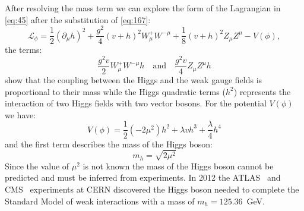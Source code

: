 After resolving the mass term we can explore the form of the Lagrangian in
\cref{eq:45} after the substitution of \cref{eq:167}:
\begin{equation}
  \label{eq:174}
  \mathcal{L}_\phi = \frac{1}{2} \left( \partial_\mu h \right)^2 +
  \frac{g^2}{4}(v + h)^2 W_\mu^+ {W^-}^\mu + \frac{1}{8}(v + h)^2 Z_\mu Z^\mu -
  V(\phi),
\end{equation}
the terms:
\begin{equation}
  \label{eq:175}
  \frac{g^2v}{2} W_\mu^+ {W^-}^\mu h \quad \mathrm{and} \quad \frac{g^2v}{4}
  Z_\mu Z^\mu h
\end{equation}
show that the coupling between the Higgs and the weak gauge fields is
proportional to their mass while the Higgs quadratic terms ($h^2$) represents
the interaction of two Higgs fields with two vector bosons. For the potential
$V(\phi)$ we have:
\begin{equation}
  \label{eq:172}
  V(\phi) = \frac{1}{2} (- 2 \mu^2) h^2 + \lambda v h^3 + \frac{\lambda}{4} h^4
\end{equation}
and the first term describes the mass of the Higgs boson:
\begin{equation}
  \label{eq:173}
  m_h = \sqrt{2 \mu^2}
\end{equation}
Since the value of $\mu^2$ is not known the mass of the Higgs boson cannot be
predicted and must be inferred from experiments. In 2012 the
ATLAS~\cite{ATLASHiggs} and CMS~\cite{CMSHiggs} experiments at CERN discovered
the Higgs boson needed to complete the Standard Model of weak interactions with
a mass of $m_h = 125.36$~GeV.
